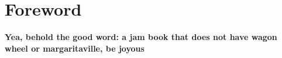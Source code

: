 \section*{Foreword}
{\bf Yea, behold the good word: a jam book that does not have wagon wheel or
margaritaville, be joyous}
